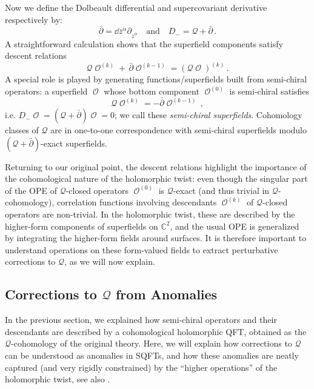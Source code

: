 \documentclass[11pt]{article}
\DeclareMathOperator{\calO}{\mathcal{O}}
\def\bbC{\mathbb{C}}
\renewcommand{\bm}{\mathcal}
\begin{document}
Now we define the Dolbeault differential and supercovariant derivative respectively by:
\begin{equation}
    \bar\partial = \dd \bar{z}^{\dot\alpha} \partial_{\bar{z}^{\dot\alpha}}
    \quad\text{and}\quad
    D_- = \bm{Q} + \bar\partial\,.
\end{equation}
A straightforward calculation shows that the superfield components satisfy descent relations
\begin{equation}\label{eq:DescentRelation}
    \bm{Q}\!\calO^{(k)}+\,\bar\partial\!\calO^{(k-1)} = (\bm{Q}\!\calO)^{(k)}\,.
\end{equation}
A special role is played by generating functions/superfields built from semi-chiral operators: a superfield $\calO$ whose bottom component $\calO^{(0)}$ is semi-chiral satisfies
\begin{equation}
    \bm{Q}\!\calO^{(k)} = -\bar\partial\! \calO^{(k-1)}\,,
\end{equation}
i.e. $D_-\!\calO = (\bm{Q}+\bar\partial)\!\calO = 0$; we call these \textit{semi-chiral superfields}. Cohomology classes of $\bm{Q}$ are in one-to-one correspondence with semi-chiral superfields modulo $(\bm{Q}+\bar\partial)$-exact superfields.

Returning to our original point, the descent relations highlight the importance of the cohomological nature of the holomorphic twist: even though the singular part of the OPE of $\bm{Q}$-closed operators $\calO^{(0)}$ is $\bm{Q}$-exact (and thus trivial in $\bm{Q}$-cohomology), correlation functions involving descendants $\calO^{(k)}$ of $\bm{Q}$-closed operators are non-trivial. In the holomorphic twist, these are described by the higher-form components of superfields on $\bbC^2$, and the usual OPE is generalized by integrating the higher-form fields around surfaces. It is therefore important to understand operations on these form-valued fields to extract perturbative corrections to $\bm{Q}$, as we will now explain.

\subsection{Corrections to \texorpdfstring{$\bm{Q}$}{Q} from Anomalies}\label{sec:QAsAnomaly}
In the previous section, we explained how semi-chiral operators and their descendants are described by a cohomological holomorphic QFT, obtained as the $\bm{Q}$-cohomology of the original theory. Here, we will explain how corrections to $\bm{Q}$ can be understood as anomalies in SQFTs, and how these anomalies are neatly captured (and very rigidly constrained) by the ``higher operations'' of the holomorphic twist, see also \cite{williams2020renormalization, Budzik:2023xbr, Gaiotto:2024gii, Bomans:2025klo, Gui:2025dqp}.
\end{document}
